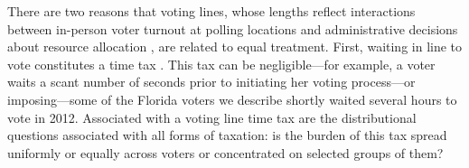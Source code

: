 \documentclass[12pt,titlepage]{article}
\begin{document}









There are two reasons that voting lines, whose lengths reflect
interactions between in-person voter turnout at polling locations and
administrative decisions about resource allocation
\citep{herronsmith:hanoverstudy}, are related to equal treatment.
First, waiting in line to vote constitutes a time tax
\citep{mukherjee:timetax}. This tax can be negligible---for example, a
voter waits a scant number of seconds prior to initiating her voting
process---or imposing---some of the Florida voters we describe shortly
waited several hours to vote in 2012. Associated with a voting line
time tax are the distributional questions associated with all forms of
taxation: is the burden of this tax spread uniformly or equally across
voters or concentrated on selected groups of them?
\end{document}
